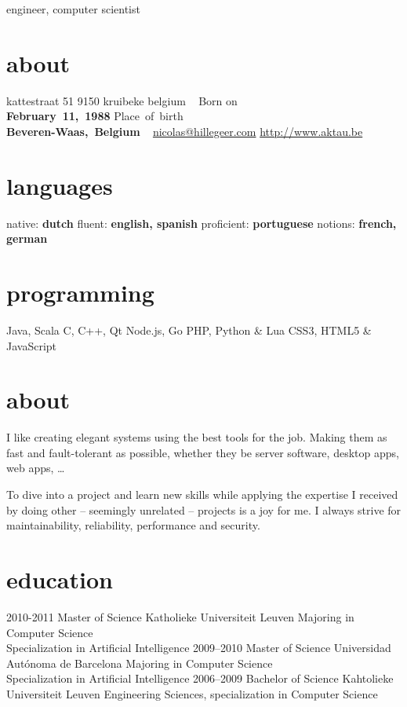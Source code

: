 \documentclass[]{friggeri-cv}
\begin{document}
       {engineer, computer scientist}


\begin{aside}
  \section{about}
    kattestraat 51
    9150 kruibeke
    belgium
    ~
    Born on\\\textbf{February~11,~1988}
    Place~of~birth\\\textbf{Beveren-Waas,~Belgium}
    ~
    \href{mailto:nicolas@hillegeer.com}{nicolas@hillegeer.com}
    \href{http://www.aktau.be}{http://www.aktau.be}
  \section{languages}
    native: \textbf{dutch}
    fluent: \textbf{english, spanish}
    proficient: \textbf{portuguese}
    notions: \textbf{french, german}
  \section{programming}
    Java, Scala
    C, C++, Qt
    Node.js, Go
    PHP, Python \& Lua
    CSS3, HTML5 \& JavaScript
\end{aside}

\section{about}

I like creating elegant systems using the best tools for the job. Making them as fast and fault-tolerant as possible,
whether they be server software, desktop apps, web apps, \ldots

To dive into a project and learn new skills while applying the expertise I received by doing other -- seemingly unrelated -- projects
is a joy for me. I always strive for maintainability, reliability, performance and security.

\section{education}

\begin{entrylist}
  \entry
    {2010-2011}
    {Master of Science}
    {Katholieke Universiteit Leuven}
    {Majoring in Computer Science\\
    Specialization in Artificial Intelligence}
  \entry
    {2009–2010}
    {Master of Science}
    {Universidad Autónoma de Barcelona}
    {Majoring in Computer Science\\
    Specialization in Artificial Intelligence}
  \entry
    {2006–2009}
    {Bachelor of Science}
    {Kahtolieke Universiteit Leuven}
    {Engineering Sciences, specialization in Computer Science}
\end{entrylist}
\end{document}
